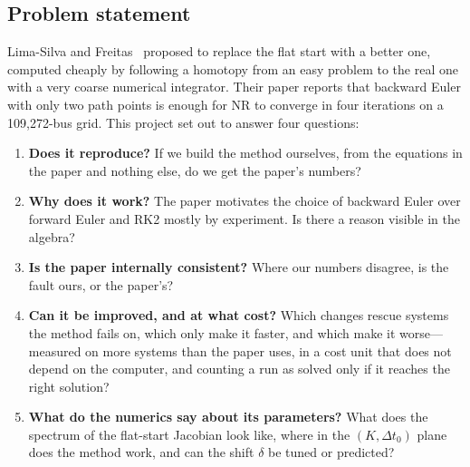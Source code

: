 \documentclass[11pt,a4paper]{article}
\begin{document}
\subsection{Problem statement}
Lima-Silva and Freitas~\cite{lima2024} proposed to replace the flat start with a better one, computed
cheaply by following a homotopy from an easy problem to the real one with a very coarse numerical
integrator. Their paper reports that backward Euler with only two path points is enough for NR to converge
in four iterations on a 109{,}272-bus grid. This project set out to answer four questions:
\begin{enumerate}[label=\textbf{Q\arabic*.}]
  \item \textbf{Does it reproduce?} If we build the method ourselves, from the equations in the paper and
        nothing else, do we get the paper's numbers?
  \item \textbf{Why does it work?} The paper motivates the choice of backward Euler over forward Euler and
        RK2 mostly by experiment. Is there a reason visible in the algebra?
  \item \textbf{Is the paper internally consistent?} Where our numbers disagree, is the fault ours, or
        the paper's?
  \item \textbf{Can it be improved, and at what cost?} Which changes rescue systems the method fails on,
        which only make it faster, and which make it worse---measured on more systems than the paper uses,
        in a cost unit that does not depend on the computer, and counting a run as solved only if it
        reaches the right solution?
  \item \textbf{What do the numerics say about its parameters?} What does the spectrum of the flat-start
        Jacobian look like, where in the $(K,\Delta t_0)$ plane does the method work, and can the shift
        $\delta$ be tuned or predicted?
\end{enumerate}
\end{document}
